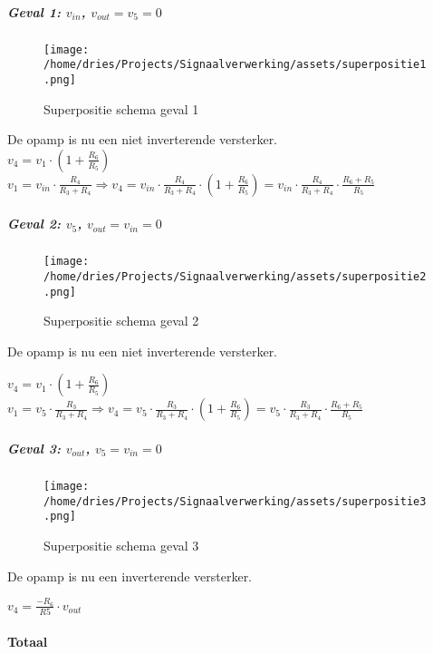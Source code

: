 \documentclass[]{article}
\let\oldparagraph\paragraph
\renewcommand{\paragraph}[1]{\oldparagraph{#1}\mbox{}}
\let\oldsubparagraph\subparagraph
\renewcommand{\subparagraph}[1]{\oldsubparagraph{#1}\mbox{}}
\begin{document}
\hypertarget{header-n5343}{%
\subparagraph{\texorpdfstring{Geval 1: \(v_{in}\),
\(v_{out} = v_5 = 0\)}{Geval 1: v\_\{in\}, v\_\{out\} = v\_5 = 0}}\label{header-n5343}}

\begin{figure}
\centering
\texttt{[image: /home/dries/Projects/Signaalverwerking/assets/superpositie1.png]}
\caption{Superpositie schema geval 1}
\end{figure}

De opamp is nu een niet inverterende versterker. \\
\(v_4 = v_1 \cdot (1+\frac{R_6}{R_5})\)\\
\(v_1 = v_{in} \cdot \frac{R_4}{R_3+R_4} \Rightarrow v_4 = v_{in} \cdot \frac{R_4}{R_3+R_4} \cdot (1+\frac{R_6}{R_5}) = v_{in} \cdot \frac{R_4}{R_3+R_4} \cdot \frac{R_6+R_5}{R_5}\)

\hypertarget{header-n5350}{%
\subparagraph{\texorpdfstring{Geval 2: \(v_5\),
\(v_{out} = v_{in} = 0\)}{Geval 2: v\_5, v\_\{out\} = v\_\{in\} = 0}}\label{header-n5350}}

\begin{figure}
\centering
\texttt{[image: /home/dries/Projects/Signaalverwerking/assets/superpositie2.png]}
\caption{Superpositie schema geval 2}
\end{figure}

De opamp is nu een niet inverterende versterker.

\(v_4 = v_1 \cdot (1+\frac{R_6}{R_5})\)\\
\(v_1 = v_5 \cdot \frac{R_3}{R_3+R_4} \Rightarrow v_4 = v_5 \cdot \frac{R_3}{R_3+R_4} \cdot (1+\frac{R_6}{R_5}) = v_5 \cdot \frac{R_3}{R_3+R_4} \cdot \frac{R_6+R_5}{R_5}\)

\hypertarget{header-n5358}{%
\subparagraph{\texorpdfstring{Geval 3: \(v_{out}\),
\(v_5 = v_{in} = 0\)}{Geval 3: v\_\{out\}, v\_5 = v\_\{in\} = 0}}\label{header-n5358}}

\begin{figure}
\centering
\texttt{[image: /home/dries/Projects/Signaalverwerking/assets/superpositie3.png]}
\caption{Superpositie schema geval 3}
\end{figure}

De opamp is nu een inverterende versterker.

\(v_4 = \frac{-R_6}{R5} \cdot v_{out}\)

\hypertarget{header-n5365}{%
\paragraph{Totaal}\label{header-n5365}}
\end{document}
